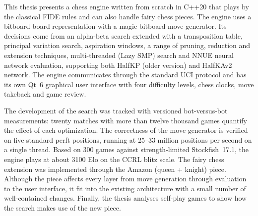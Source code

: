 This thesis presents a chess engine written from scratch in C++20 that plays by the classical FIDE rules and can also handle fairy chess pieces. The engine uses a bitboard board representation with a magic-bitboard move generator. Its decisions come from an alpha-beta search extended with a transposition table, principal variation search, aspiration windows, a range of pruning, reduction and extension techniques, multi-threaded (Lazy SMP) search and NNUE neural network evaluation, supporting both HalfKP (older version) and HalfKAv2 network. The engine communicates through the standard UCI protocol and has its own Qt~6 graphical user interface with four difficulty levels, chess clocks, move takeback and game review.

The development of the search was tracked with versioned bot-versus-bot measurements: twenty matches with more than twelve thousand games quantify the effect of each optimization. The correctness of the move generator is verified on five standard perft positions, running at 25--33 million positions per second on a single thread. Based on 300 games against strength-limited Stockfish~17.1, the engine plays at about 3100 Elo on the CCRL blitz scale. The fairy chess extension was implemented through the Amazon (queen + knight) piece. Although the piece affects every layer from move generation through evaluation to the user interface, it fit into the existing architecture with a small number of well-contained changes. Finally, the thesis analyses self-play games to show how the search makes use of the new piece.

\vfill
\selectthesislanguage

\setcounter{romanPage}{\value{page}}
